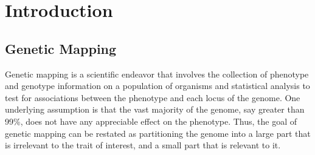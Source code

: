 \chapter{Introduction}

\section{Genetic Mapping}

Genetic mapping is a scientific endeavor that involves the collection of phenotype and genotype information on a population of organisms and statistical analysis to test for associations between the phenotype and each locus of the genome.
One underlying assumption is that the vast majority of the genome, say greater than 99\%, does not have any appreciable effect on the phenotype.
Thus, the goal of genetic mapping can be restated as partitioning the genome into a large part that is irrelevant to the trait of interest, and a small part that is relevant to it.

